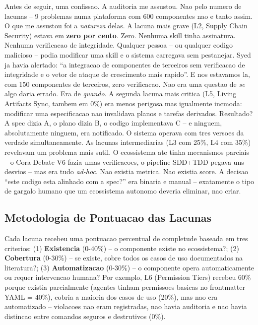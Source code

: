 \documentclass[12pt,a4paper,oneside,sumario=tradicional,chapter=TITLE,section=TITLE,subsection=TITLE,english,brazil]{abntex2}
\begin{document}
Antes de seguir, uma confissao. A auditoria me assustou. Nao pelo numero de lacunas -- 9 problemas numa plataforma com 600 componentes nao e tanto assim. O que me assustou foi a \textit{natureza} delas. A lacuna mais grave (L2, Supply Chain Security) estava em \textbf{zero por cento}. Zero. Nenhuma skill tinha assinatura. Nenhuma verificacao de integridade. Qualquer pessoa -- ou qualquer codigo malicioso -- podia modificar uma skill e o sistema carregava sem pestanejar. Syed \cite{syed2024emerging} ja havia alertado: ``a integracao de componentes de terceiros sem verificacao de integridade e o vetor de ataque de crescimento mais rapido''. E nos estavamos la, com 150 componentes de terceiros, zero verificacao. Nao era uma questao de \textit{se} algo daria errado. Era de \textit{quando}. A segunda lacuna mais critica (L5, Living Artifacts Sync, tambem em 0\%) era menos perigosa mas igualmente incmoda: modificar uma especificacao nao invalidava planos e tarefas derivados. Resultado? A spec dizia A, o plano dizia B, o codigo implementava C -- e ninguem, absolutamente ninguem, era notificado. O sistema operava com tres versoes da verdade simultaneamente. As lacunas intermediarias (L3 com 25\%, L4 com 35\%) revelavam um problema mais sutil. O ecossistema ate tinha mecanismos parciais -- o Cora-Debate V6 fazia umas verificacoes, o pipeline SDD+TDD pegava uns desvios -- mas era tudo \textit{ad-hoc}. Nao existia metrica. Nao existia score. A decisao ``este codigo esta alinhado com a spec?'' era binaria e manual -- exatamente o tipo de gargalo humano que um ecossistema autonomo deveria eliminar, nao criar.

\subsection{Metodologia de Pontuacao das Lacunas}

Cada lacuna recebeu uma pontuacao percentual de completude baseada em tres criterios: (1) \textbf{Existencia} (0-40\%) -- o componente existe no ecossistema?; (2) \textbf{Cobertura} (0-30\%) -- se existe, cobre todos os casos de uso documentados na literatura?; (3) \textbf{Automatizacao} (0-30\%) -- o componente opera automaticamente ou requer intervencao humana? Por exemplo, L6 (Permission Tiers) recebeu 60\% porque existia parcialmente (agentes tinham permissoes basicas no frontmatter YAML = 40\%), cobria a maioria dos casos de uso (20\%), mas nao era automatizado -- violacoes nao eram registradas, nao havia auditoria e nao havia distincao entre comandos seguros e destrutivos (0\%).
\end{document}
